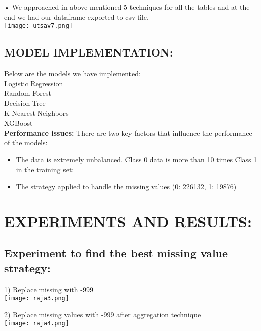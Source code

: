 \documentclass[fleqn,10pt]{SelfArx} %
\begin{document}
\begin{itemize}
\noindent
•	We approached in above mentioned 5 techniques for all the tables and at the end we had our dataframe exported to csv file.\\


\texttt{[image: utsav7.png]}
\label{fig:results}



\subsection{MODEL IMPLEMENTATION: }
Below are the models we have implemented:\\
Logistic Regression\\
Random Forest\\
Decision Tree\\
K Nearest Neighbors\\
XGBoost\\

\noindent
\textbf{Performance issues:}
There are two key factors that influence the performance of the models:\\
\begin{itemize}
	\item The data is extremely unbalanced. Class 0 data is more than 10 times Class 1 in the training set:\\
	\item The strategy applied to handle the missing values
	({0: 226132, 1: 19876})
\end{itemize}



\pagebreak
\section{EXPERIMENTS AND RESULTS:}

\subsection{Experiment to find the best missing value strategy:}
1)	Replace missing with -999\\

\texttt{[image: raja3.png]}
\label{fig:results}

2)	Replace missing values with -999 after aggregation technique\\

\texttt{[image: raja4.png]}
\label{fig:results}


\end{itemize}
\end{document}
